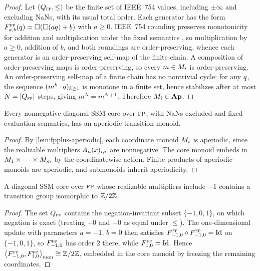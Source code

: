 \documentclass{article}
\begin{document}
\begin{proof}
Let $(Q_{\textsc{fp}}, \le)$ be the finite set of IEEE~754 values, including $\pm\infty$ and excluding NaNs, with its usual total order.
Each generator has the form $F_{a,b}^{\textsc{fp}}(q) = \square(\square(aq) + b)$ with $a \ge 0$.
IEEE~754 rounding preserves monotonicity for addition and multiplication under the fixed semantics \citep[Thms.~II.1, II.3]{mikaitis2024monotonicity}, so multiplication by $a \ge 0$, addition of $b$, and both roundings are order-preserving, whence each generator is an order-preserving self-map of the finite chain.
A composition of order-preserving maps is order-preserving, so every $m \in M_i$ is order-preserving.
An order-preserving self-map of a finite chain has no nontrivial cycle: for any $q$, the sequence $(m^k \cdot q)_{k \ge 1}$ is monotone in a finite set, hence stabilizes after at most $N = |Q_{\textsc{fp}}|$ steps, giving $m^N = m^{N+1}$.
Therefore $M_i \in \mathbf{Ap}$.
\end{proof}


\begin{corollary}\label{cor:aperiodic}
Every nonnegative diagonal SSM core over $\textsc{fp}$, with NaNs excluded and fixed evaluation semantics, has an aperiodic transition monoid.
\end{corollary}

\begin{proof}
By \cref{lem:fpplus-aperiodic}, each coordinate monoid $M_i$ is aperiodic, since the realizable multipliers $A_n(x)_{i,i}$ are nonnegative.
The core monoid embeds in $M_1 \times \cdots \times M_m$ by the coordinatewise action.
Finite products of aperiodic monoids are aperiodic, and submonoids inherit aperiodicity.
\end{proof}


\begin{lemma}\label{lem:fp-c2}
A diagonal SSM core over $\textsc{fp}$ whose realizable multipliers include $-1$ contains a transition group isomorphic to $\mathbb{Z}/{2}\mathbb{Z}$.
\end{lemma}

\begin{proof}
The set $Q_{\textsc{fp}}$ contains the negation-invariant subset $\{-1, 0, 1\}$, on which negation is exact (treating $+0$ and $-0$ as equal under $\le$).
The one-dimensional update with parameters $a = -1$, $b = 0$ then satisfies $F_{-1,0}^{\textsc{fp}} \circ F_{-1,0}^{\textsc{fp}} = \mathrm{Id}$ on $\{-1, 0, 1\}$, so $F_{-1,0}^{\textsc{fp}}$ has order $2$ there, while $F_{1,0}^{\textsc{fp}} = \mathrm{Id}$.
Hence $\bigl\langle F_{-1,0}^{\textsc{fp}}, F_{1,0}^{\textsc{fp}} \bigr\rangle_{\mathrm{mon}} \cong \mathbb{Z}/{2}\mathbb{Z}$, embedded in the core monoid by freezing the remaining coordinates.
\end{proof}
\end{document}
